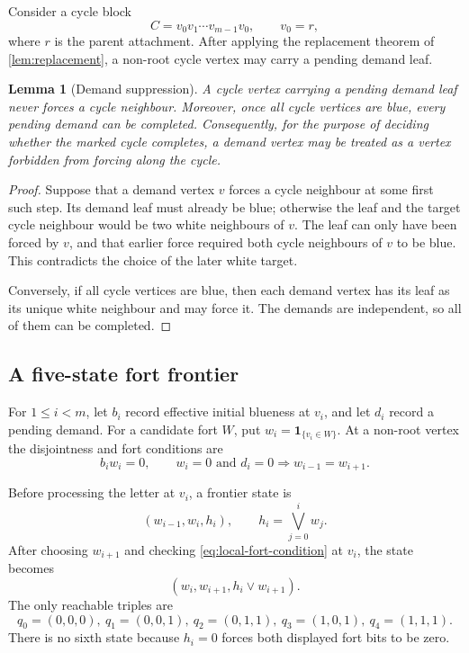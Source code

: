 \documentclass[11pt,reqno]{amsart}
\newtheorem{lemma}[lemma]{Lemma}
\theoremstyle{definition}
\newcommand{\one}{\mathbf 1}
\begin{document}
Consider a cycle block
\[
  C=v_0v_1\cdots v_{m-1}v_0,
  \qquad v_0=r,
\]
where $r$ is the parent attachment.  After applying the replacement theorem
of \cref{lem:replacement}, a non-root cycle vertex may carry a pending demand
leaf.

\begin{lemma}[Demand suppression]\label{lem:demand-suppression}
A cycle vertex carrying a pending demand leaf never forces a cycle neighbour.
Moreover, once all cycle vertices are blue, every pending demand can be
completed.  Consequently, for the purpose of deciding whether the marked
cycle completes, a demand vertex may be treated as a vertex forbidden from
forcing along the cycle.
\end{lemma}

\begin{proof}
Suppose that a demand vertex $v$ forces a cycle neighbour at some first such
step.  Its demand leaf must already be blue; otherwise the leaf and the target
cycle neighbour would be two white neighbours of $v$.  The leaf can only have
been forced by $v$, and that earlier force required both cycle neighbours of
$v$ to be blue.  This contradicts the choice of the later white target.

Conversely, if all cycle vertices are blue, then each demand vertex has its
leaf as its unique white neighbour and may force it.  The demands are
independent, so all of them can be completed.
\end{proof}

\subsection{A five-state fort frontier}

For $1\le i<m$, let $b_i$ record effective initial blueness at $v_i$, and let
$d_i$ record a pending demand.  For a candidate fort $W$, put
$w_i=\one_{\{v_i\in W\}}$.  At a non-root vertex the disjointness and fort
conditions are
\begin{equation}\label{eq:local-fort-condition}
  b_iw_i=0,
  \qquad
  w_i=0\text{ and }d_i=0\Longrightarrow w_{i-1}=w_{i+1}.
\end{equation}

Before processing the letter at $v_i$, a frontier state is
\[
  (w_{i-1},w_i,h_i),
  \qquad
  h_i=\bigvee_{j=0}^{i}w_j.
\]
After choosing $w_{i+1}$ and checking \eqref{eq:local-fort-condition} at
$v_i$, the state becomes
\[
  (w_i,w_{i+1},h_i\vee w_{i+1}).
\]
The only reachable triples are
\[
 q_0=(0,0,0),\ q_1=(0,0,1),\ q_2=(0,1,1),\
 q_3=(1,0,1),\ q_4=(1,1,1).
\]
There is no sixth state because $h_i=0$ forces both displayed fort bits to be
zero.
\end{document}

